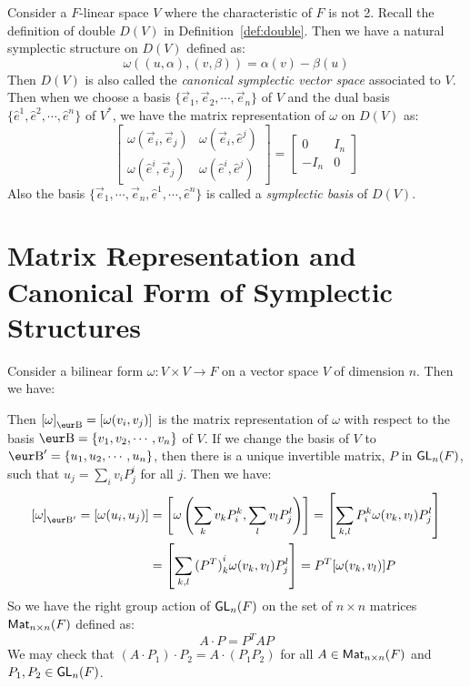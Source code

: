 Consider a $F$-linear space $V$ where the characteristic of $F$ is not 2. Recall the definition of double $D(V)$ in Definition~\ref{def:double}. Then we have a natural symplectic structure on $D(V)$ defined as:
\[
	\omega ((u, \alpha), (v, \beta)) = \alpha(v) - \beta(u)
\]
Then $D(V)$ is also called the \emph{canonical symplectic vector space} associated to $V$. Then when we choose a basis $\{ \vec{e}_1, \vec{e}_2, \cdots, \vec{e}_n \}$ of $V$ and the dual basis $\{ \hat{e}^1, \hat{e}^2, \cdots, \hat{e}^n \}$ of $V^*$, we have the matrix representation of $\omega$ on $D(V)$ as:
\[
	\begin{bmatrix}
		\omega (\vec{e}_i, \vec{e}_j) & \omega (\vec{e}_i, \hat{e}^j) \\
		\omega (\hat{e}^i, \vec{e}_j) & \omega (\hat{e}^i, \hat{e}^j)
	\end{bmatrix} = \begin{bmatrix}
		0    & I_n \\
		-I_n & 0
	\end{bmatrix}
\]
Also the basis $\{ \vec{e}_1, \cdots, \vec{e}_n, \hat{e}^1, \cdots, \hat{e}^n \}$ is called a \emph{symplectic basis} of $D(V)$.

\section{Matrix Representation and Canonical Form of Symplectic Structures}

Consider a bilinear form $\omega : V \times V \to F$ on a vector space $V$ of dimension $n$. Then we have:
\begin{center}
\end{center}
Then ${[\omega]}_{\B} = [\omega (v_i, v_j)]$ is the matrix representation of $\omega$ with respect to the basis $\B = \{ v_1, v_2, \cdots, v_n \}$ of $V$. If we change the basis of $V$ to $\B' = \{ u_1, u_2, \cdots, u_n \}$, then there is a unique invertible matrix, $P$ in $\operatorname{\text{\normalfont\sffamily GL}}_n(F)$, such that $u_j = \sum_i v_i P^i_j$ for all $j$. Then we have:
\begin{align*}
	{[\omega]}_{\B'} = [\omega (u_i, u_j)] & = \left[ \omega \left(\sum_k v_k P^k_i, \sum_l v_l P^l_j\right) \right] = \left[ \sum_{k, l} P^k_i \omega (v_k, v_l) P^l_j \right] \\
	                                     & = \left[ \sum_{k, l} {(P^T)}^i_k \omega (v_k, v_l) P^l_j \right] = P^T [\omega (v_k, v_l)] P
\end{align*}
So we have the right group action of $\operatorname{\text{\normalfont\sffamily GL}}_n(F)$ on the set of $n \times n$ matrices $\operatorname{\text{\normalfont\sffamily Mat}}_{n \times n}(F)$ defined as:
\[
	A \cdot P = P^T A P
\]
We may check that $(A \cdot P_1) \cdot P_2 = A \cdot (P_1 P_2)$ for all $A \in \operatorname{\text{\normalfont\sffamily Mat}}_{n \times n}(F)$ and $P_1, P_2 \in \operatorname{\text{\normalfont\sffamily GL}}_n(F)$.

